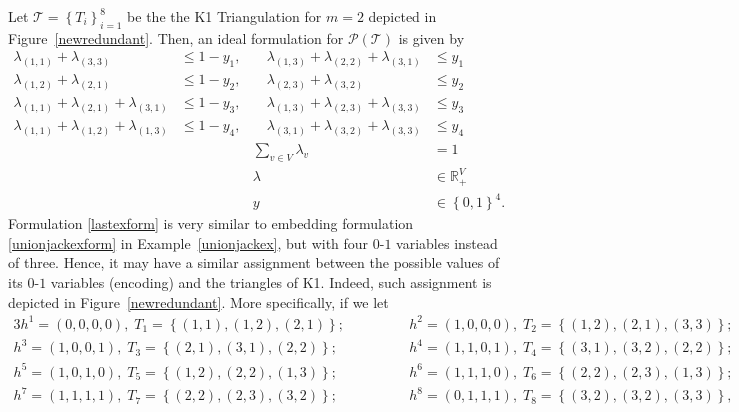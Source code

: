 \documentclass[mnsc]{informs3}
\newcommand{\set}[1]{\left\{#1\right\}}                     %
\newcommand{\bra}[1]{\left(#1\right)}
\newcommand{\Real}{\mathbb R}
\begin{document}
\begin{example}\label{lastex}Let $\mathcal{T}=\set{T_i}_{i=1}^8$ be the the K1 Triangulation for $m=2$ depicted in Figure~\ref{newredundant}. Then, an ideal formulation for $\mathcal{P}\bra{\mathcal{T}}$ is given by
 \begin{subequations}\label{lastexform}
 \begin{alignat}{6}
   \lambda_{\bra{1,1}}+\lambda_{\bra{3,3}}&\leq 1-y_1,&\quad 
  \lambda_{\bra{1,3}}+\lambda_{\bra{2,2}}+\lambda_{\bra{3,1}}&\leq y_1&\quad& \\
    \lambda_{\bra{1,2}}+\lambda_{\bra{2,1}}&\leq 1-y_2,&\quad 
  \lambda_{\bra{2,3}}+\lambda_{\bra{3,2}}&\leq y_2&\quad& \\
  \lambda_{\bra{1,1}}+\lambda_{\bra{2,1}}+\lambda_{\bra{3,1}}& \leq 1-y_3, &\quad 
\lambda_{\bra{1,3}}+\lambda_{\bra{2,3}}+\lambda_{\bra{3,3}}& \leq y_3 &\quad&\\
  \lambda_{\bra{1,1}}+\lambda_{\bra{1,2}}+\lambda_{\bra{1,3}}& \leq 1-y_4, &\quad  
\lambda_{\bra{3,1}}+\lambda_{\bra{3,2}}+\lambda_{\bra{3,3}}& \leq y_4 &\quad&\\
 &&\sum\nolimits_{v\in V} \lambda_v &=1 \\
 &&\lambda &\in \Real_+^V\\
  &&y&\in \set{0,1}^4. &\quad& 
 \end{alignat}
 \end{subequations}
Formulation \eqref{lastexform} is very similar to embedding formulation \eqref{unionjackexform} in Example~\ref{unionjackex}, but with four $0$-$1$ variables instead of three. Hence, it may have a similar assignment between  the possible values of its $0$-$1$ variables (encoding) and the triangles of K1. Indeed, such assignment is depicted in Figure~\ref{newredundant}. More specifically,  if we let 
 \begin{alignat*}{3}
 h^1=(0,0,0,0),\; T_1=\set{\bra{1,1},\bra{1,2},\bra{2,1}};&\quad\quad\quad&h^2=(1,0,0,0),\; T_2=\set{\bra{1,2},\bra{2,1},\bra{3,3}};\\
 h^3=(1,0,0,1),\; T_3=\set{\bra{2,1},\bra{3,1},\bra{2,2}};&\quad\quad\quad&h^4=(1,1,0,1),\; T_4=\set{\bra{3,1},\bra{3,2},\bra{2,2}};\\ 
 h^5=(1,0,1,0),\; T_5=\set{\bra{1,2},\bra{2,2},\bra{1,3}};&\quad\quad\quad&h^6=(1,1,1,0),\; T_6=\set{\bra{2,2},\bra{2,3},\bra{1,3}};\\ 
 h^7=(1,1,1,1),\; T_7=\set{\bra{2,2},\bra{2,3},\bra{3,2}};&\quad\quad\quad&h^8=(0,1,1,1),\; T_8=\set{\bra{3,2},\bra{3,2},\bra{3,3}},
  \end{alignat*}

\end{example}
\end{document}
